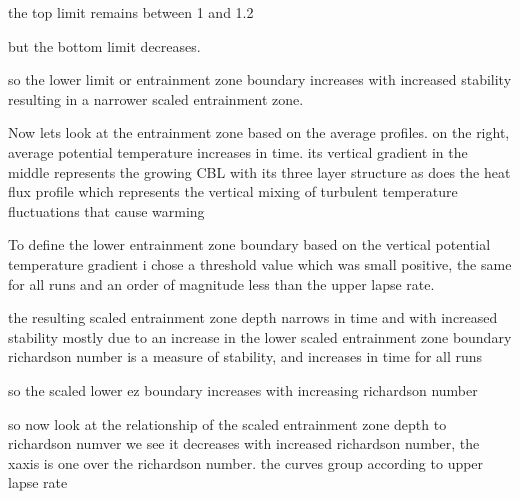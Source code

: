 \documentclass{beamer}
\begin{document}
\begin{frame}
the top limit remains between 1 and 1.2
\end{frame}

\begin{frame}
but the bottom limit decreases.
\end{frame}

\begin{frame}
\end{frame}



\begin{frame}
so the lower limit or entrainment zone boundary increases with increased stability resulting in a narrower scaled entrainment zone.
\end{frame}

\begin{frame}
Now lets look at the entrainment zone based on the average profiles. on the right, average potential temperature increases in time.   its vertical gradient in the middle represents the growing CBL with its three layer structure as does the heat flux profile which represents the vertical mixing of turbulent temperature fluctuations that cause warming\\
\end{frame}

\begin{frame}
To define the lower entrainment zone boundary based on the vertical potential temperature gradient i chose a threshold value which was small positive, the same for all runs and an order of magnitude less than the upper lapse rate.\\
\end{frame}

\begin{frame}
the resulting scaled entrainment zone depth narrows in time and with increased stability mostly due to an increase in the lower scaled entrainment zone boundary richardson number is a measure of stability, and increases in time for all runs\\
\end{frame}

\begin{frame}
so the scaled lower ez boundary increases with increasing richardson number\\
\end{frame}


\begin{frame}
so now look at the relationship of the scaled entrainment zone depth to richardson numver we see it decreases with increased richardson number, the xaxis is one over the richardson number. the curves group according to upper lapse rate\\
\end{frame}
\end{document}

